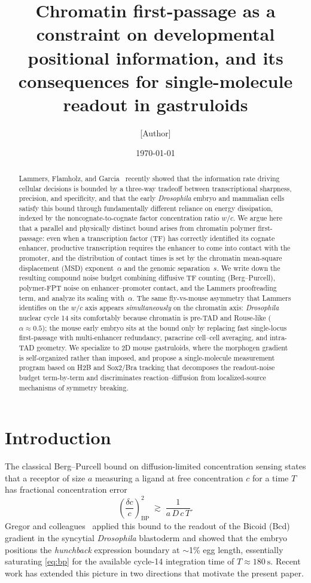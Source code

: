 \documentclass[11pt]{article}
\title{Chromatin first-passage as a constraint on developmental
positional information, and its consequences for single-molecule readout
in gastruloids}
\author{[Author]}
\affil{[Affiliation]}
\date{\today}
\newcommand{\BP}{\mathrm{BP}}
\begin{document}
\maketitle

\begin{abstract}
Lammers, Flamholz, and Garcia~\cite{Lammers2023} recently showed that the
information rate driving cellular decisions is bounded by a three-way
tradeoff between transcriptional sharpness, precision, and specificity, and
that the early \textit{Drosophila} embryo and mammalian cells satisfy this
bound through fundamentally different reliance on energy dissipation,
indexed by the noncognate-to-cognate factor concentration ratio $w/c$. We
argue here that a parallel and physically distinct bound arises from
chromatin polymer first-passage: even when a transcription factor (TF) has
correctly identified its cognate enhancer, productive transcription
requires the enhancer to come into contact with the promoter, and the
distribution of contact times is set by the chromatin mean-square
displacement (MSD) exponent~$\alpha$ and the genomic separation~$s$. We
write down the resulting compound noise budget combining diffusive TF
counting (Berg--Purcell), polymer-FPT noise on enhancer--promoter contact,
and the Lammers proofreading term, and analyze its scaling with~$\alpha$.
The same fly-vs-mouse asymmetry that Lammers identifies on the $w/c$ axis
appears \emph{simultaneously} on the chromatin axis: \textit{Drosophila}
nuclear cycle 14 sits comfortably because chromatin is pre-TAD and
Rouse-like ($\alpha\!\approx\!0.5$); the mouse early embryo sits at the
bound only by replacing fast single-locus first-passage with multi-enhancer
redundancy, paracrine cell--cell averaging, and intra-TAD geometry. We
specialize to 2D mouse gastruloids, where the morphogen gradient is
self-organized rather than imposed, and propose a single-molecule
measurement program based on H2B and Sox2/Bra tracking that decomposes the
readout-noise budget term-by-term and discriminates reaction--diffusion
from localized-source mechanisms of symmetry breaking.
\end{abstract}

\section{Introduction}

The classical Berg--Purcell bound on diffusion-limited concentration sensing
states that a receptor of size $a$ measuring a ligand at free concentration
$c$ for a time $T$ has fractional concentration error
\begin{equation}
  \left(\frac{\delta c}{c}\right)^{\!2}_{\BP}
  \;\gtrsim\; \frac{1}{a\,D\,c\,T}.
  \label{eq:bp}
\end{equation}
Gregor and colleagues~\cite{Gregor2007a,Gregor2007b} applied this bound to
the readout of the Bicoid (Bcd) gradient in the syncytial \textit{Drosophila}
blastoderm and showed that the embryo positions the \textit{hunchback}
expression boundary at $\sim$1\% egg length, essentially saturating
\eqref{eq:bp} for the available cycle-14 integration time of $T \approx
\SI{180}{\second}$. Recent work has extended this picture in two directions
that motivate the present paper.
\end{document}
